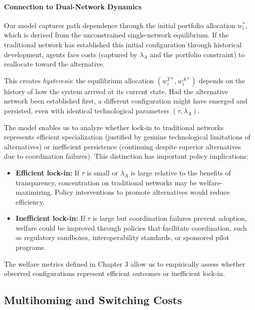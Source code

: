 \paragraph{Connection to Dual-Network Dynamics}

Our model captures path dependence through the initial portfolio allocation $w_i^*$, which is derived from the unconstrained single-network equilibrium. If the traditional network has established this initial configuration through historical development, agents face costs (captured by $\lambda_A$ and the portfolio constraint) to reallocate toward the alternative.

This creates \textit{hysteresis}: the equilibrium allocation $(w_i^{T*}, w_i^{A*})$ depends on the history of how the system arrived at its current state. Had the alternative network been established first, a different configuration might have emerged and persisted, even with identical technological parameters $(\tau, \lambda_A)$.

The model enables us to analyze whether lock-in to traditional networks represents efficient specialization (justified by genuine technological limitations of alternatives) or inefficient persistence (continuing despite superior alternatives due to coordination failures). This distinction has important policy implications:

\begin{itemize}
    \item \textbf{Efficient lock-in:} If $\tau$ is small or $\lambda_A$ is large relative to the benefits of transparency, concentration on traditional networks may be welfare-maximizing. Policy interventions to promote alternatives would reduce efficiency.
    
    \item \textbf{Inefficient lock-in:} If $\tau$ is large but coordination failures prevent adoption, welfare could be improved through policies that facilitate coordination, such as regulatory sandboxes, interoperability standards, or sponsored pilot programs.
\end{itemize}

The welfare metrics defined in Chapter 3 allow us to empirically assess whether observed configurations represent efficient outcomes or inefficient lock-in.

\subsection{Multihoming and Switching Costs}

